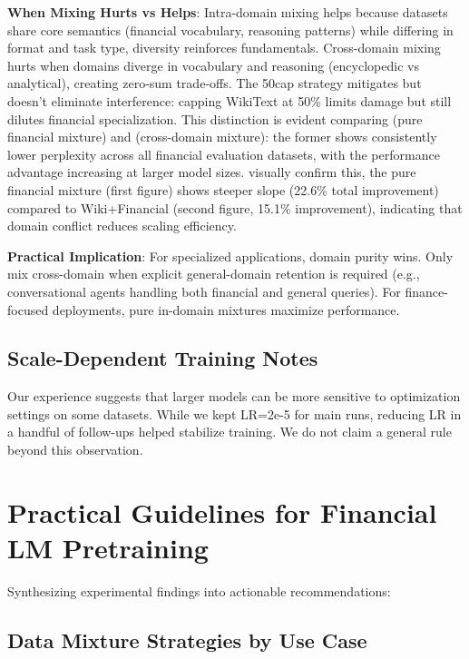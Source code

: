\textbf{When Mixing Hurts vs Helps}: Intra-domain mixing helps because datasets share core semantics (financial vocabulary, reasoning patterns) while differing in format and task type, diversity reinforces fundamentals. Cross-domain mixing hurts when domains diverge in vocabulary and reasoning (encyclopedic vs analytical), creating zero-sum trade‑offs. The 50cap strategy mitigates but doesn't eliminate interference: capping WikiText at 50\% limits damage but still dilutes financial specialization. This distinction is evident comparing  (pure financial mixture) and  (cross-domain mixture): the former shows consistently lower perplexity across all financial evaluation datasets, with the performance advantage increasing at larger model sizes.  visually confirm this, the pure financial mixture (first figure) shows steeper slope (22.6\% total improvement) compared to Wiki+Financial (second figure, 15.1\% improvement), indicating that domain conflict reduces scaling efficiency.

\textbf{Practical Implication}: For specialized applications, domain purity wins. Only mix cross-domain when explicit general-domain retention is required (e.g., conversational agents handling both financial and general queries). For finance-focused deployments, pure in-domain mixtures maximize performance.

\subsection{Scale-Dependent Training Notes}

Our experience suggests that larger models can be more sensitive to optimization settings on some datasets. While we kept LR=2e-5 for main runs, reducing LR in a handful of follow-ups helped stabilize training. We do not claim a general rule beyond this observation.

\section{Practical Guidelines for Financial LM Pretraining}

Synthesizing experimental findings into actionable recommendations:

\subsection{Data Mixture Strategies by Use Case}

